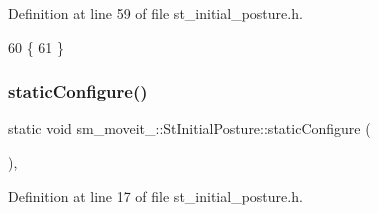 Definition at line 59 of file st\+\_\+initial\+\_\+posture.\+h.


\begin{DoxyCode}
60     \{
61     \}
\end{DoxyCode}
\mbox{\label{structsm__moveit__3_1_1StInitialPosture_aa22570b3121559db381a808aa0052d0b}} 
\subsubsection{\texorpdfstring{static\+Configure()}{staticConfigure()}}
{\footnotesize\ttfamily static void sm\+\_\+moveit\+\_\+::\+St\+Initial\+Posture\+::static\+Configure (\begin{DoxyParamCaption}{ }\end{DoxyParamCaption})\hspace{0.3cm}{\ttfamily [inline]}, {\ttfamily [static]}}



Definition at line 17 of file st\+\_\+initial\+\_\+posture.\+h.


